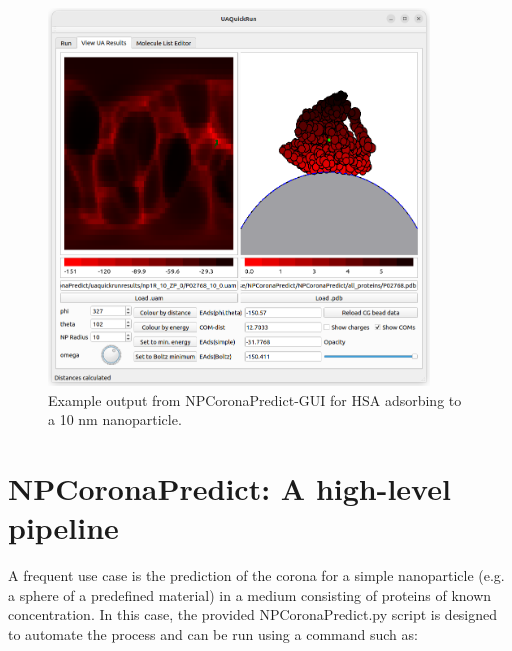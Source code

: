 \documentclass[10pt,a4paper,onecolumn]{report}
\begin{document}
\begin{figure} \label{fig:uaquickrun_results}
    \centering
    \includegraphics[width=0.9\textwidth]{figures/uaquickrun_screen.png}
    \caption{Example output from NPCoronaPredict-GUI for HSA adsorbing to a 10 nm nanoparticle. }
\end{figure}

 
 
\chapter{NPCoronaPredict: A high-level pipeline}
A frequent use case is the prediction of the corona for a simple nanoparticle (e.g. a sphere of a predefined material) in a medium consisting of proteins of known concentration. In this case, the provided NPCoronaPredict.py script is designed to automate the process and can be run using a command such as:
\end{document}

